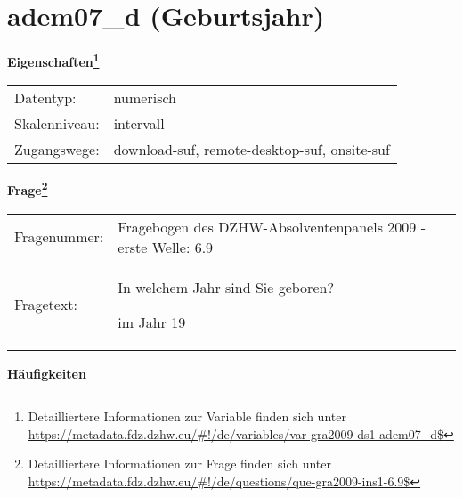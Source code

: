 
    \setcounter{footnote}{0}

    \vspace*{-1.8cm}
	\section{adem07\_d (Geburtsjahr)}
	\label{section:adem07_d}



    \vspace*{0.5cm}
    \noindent\textbf{Eigenschaften\footnote{Detailliertere Informationen zur Variable finden sich unter
		\url{https://metadata.fdz.dzhw.eu/\#!/de/variables/var-gra2009-ds1-adem07_d$}}}\\
	\begin{tabularx}{\hsize}{@{}lX}
	Datentyp: & numerisch \\
	Skalenniveau: & intervall \\
	Zugangswege: &
	  download-suf, 
	  remote-desktop-suf, 
	  onsite-suf
 \\
    \end{tabularx}



				\vspace*{0.5cm}
                \noindent\textbf{Frage\footnote{Detailliertere Informationen zur Frage finden sich unter
		              \url{https://metadata.fdz.dzhw.eu/\#!/de/questions/que-gra2009-ins1-6.9$}}}\\
				\begin{tabularx}{\hsize}{@{}lX}
					Fragenummer: &
					  Fragebogen des DZHW-Absolventenpanels 2009 - erste Welle:
					  6.9
 \\
					Fragetext: & In welchem Jahr sind Sie geboren?\par  im Jahr 19 \\
				\end{tabularx}





        		\vspace*{0.5cm}
                \noindent\textbf{Häufigkeiten}


